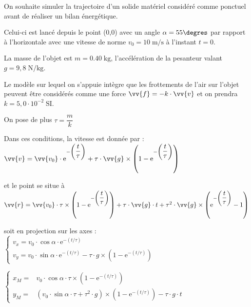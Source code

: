 \documentclass[11pt]{article}
\begin{document}
On souhaite simuler la trajectoire d'un solide matériel considéré comme ponctuel avant de réaliser un bilan énergétique. 

Celui-ci est lancé depuis le point (0,0) avec un angle $\alpha = 55\degres$ par rapport à l'horizontale avec une vitesse de norme $v_0 = 10\;\text{m/s}$ à l'instant $t = 0$.

La masse de l'objet est $m = 0.40\;\text{kg}$, l'accélération de la pesanteur valant $g = 9,8\;\text{N/kg}$.

Le modèle sur lequel on s'appuie intègre que les frottements de l'air sur l'objet peuvent être considérés comme une force $\vv{f} = -k\cdot \vv{v}$ et on prendra $k = 5,0\cdot 10^{-2}\;\text{SI}$.



On pose de plus $\tau = \dfrac{m}{k}$

Dans ces conditions, la vitesse est donnée par : $\vv{v} = \vv{v_0}\cdot \text{e}^{-\left(\dfrac{t}{\tau}\right)}+\tau\cdot \vv{g}\times \left(1 - \text{e}^{-\left(\dfrac{t}{\tau}\right)}\right)$ 

et le point se situe à $\vv{r} = \vv{v_0}\cdot \tau\times\left( 1 -  \text{e}^{-\left(\dfrac{t}{\tau}\right)}\right)+\tau\cdot \vv{g}\cdot t + \tau^2\cdot \vv{g}\times \left( \text{e}^{-\left(\dfrac{t}{\tau}\right)} - 1\right)$ 

soit en projection sur les axes : $\left\{ \begin{array}{ll}
                                            v_x = v_0\cdot \cos \alpha \cdot \text{e}^{-\left(t/\tau\right)}\\
                                            
                                            v_y = v_0\cdot \sin \alpha \cdot \text{e}^{-\left(t/\tau\right)} - {\tau\cdot g}\times \left(1 - \text{e}^{-\left(t/\tau\right)}\right)
                                            
                                           \end{array}\right.$






$\left\{ \begin{array}{ll}
x_M =& {v_0}\cdot \cos \alpha\cdot \tau\times\left( 1 -  \text{e}^{-\left(t/\tau\right)}\right) \\                                                                                                                                                                                           


y_M =& \left( {v_0}\cdot \sin \alpha \cdot \tau+ \tau^2\cdot {g}\right) \times\left( 1 -  \text{e}^{-\left(t/\tau\right)}\right)-\tau\cdot {g}\cdot t
\end{array}\right.$
\end{document}
